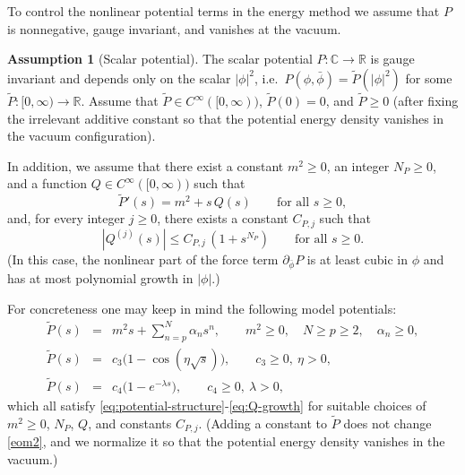 \documentclass[11pt]{article}
\numberwithin{equation}{section}
\theoremstyle{plain}
\theoremstyle{definition}
\newtheorem{assumption}{Assumption}[section]
\theoremstyle{remark}
\begin{document}
To control the nonlinear potential terms in the energy method we assume that $P$ is nonnegative, gauge invariant, and vanishes at the vacuum.
\begin{assumption}[Scalar potential]\label{asumsiP}
The scalar potential $P:\mathbb{C}\to\mathbb{R}$ is gauge invariant and depends only on the scalar $|\phi|^{2}$, i.e.\ $P(\phi,\bar\phi)=\widetilde P(|\phi|^{2})$ for some $\widetilde P:[0,\infty)\to\mathbb{R}$.
Assume that $\widetilde P\in C^\infty([0,\infty))$, $\widetilde P(0)=0$, and $\widetilde P\ge 0$ (after fixing the irrelevant additive constant so that the potential energy density vanishes in the vacuum configuration).

In addition, we assume that there exist a constant $m^{2}\ge 0$, an integer $N_{P}\ge 0$, and a function $Q\in C^\infty([0,\infty))$ such that
\begin{equation}\label{eq:potential-structure}
\widetilde P'(s)=m^{2}+s\,Q(s)\qquad\text{for all }s\ge 0,
\end{equation}
and, for every integer $j\ge0$, there exists a constant $C_{P,j}$ such that
\begin{equation}\label{eq:Q-growth}
|Q^{(j)}(s)|\le C_{P,j}\,(1+s^{N_{P}})\qquad\text{for all }s\ge 0.
\end{equation}
(In this case, the nonlinear part of the force term $\partial_{\bar\phi}P$ is at least cubic in $\phi$ and has at most polynomial growth in $|\phi|$.)

For concreteness one may keep in mind the following model potentials:
\begin{eqnarray}
\widetilde P(s)
&=&
m^2s+\sum_{n=p}^{N}\alpha_{n}s^{n},
\qquad m^2\ge0,\quad N\ge p\ge2,\quad \alpha_n\ge 0,
\label{V4}
\\
\widetilde P(s)
&=&
c_{3}\bigl(1-\cos(\eta\sqrt{s})\bigr),
\qquad c_3\ge 0,\ \eta>0,
\label{sine}
\\
\widetilde P(s)
&=&
c_{4}\bigl(1-e^{-\lambda s}\bigr),
\qquad c_4\ge 0,\ \lambda>0,
\label{toda}
\end{eqnarray}
which all satisfy \eqref{eq:potential-structure}-\eqref{eq:Q-growth} for suitable choices of $m^{2}\ge0$, $N_{P}$, $Q$, and constants $C_{P,j}$.
(Adding a constant to $\widetilde P$ does not change \eqref{eom2}, and we normalize it so that the potential energy density vanishes in the vacuum.)
\end{assumption}
\end{document}
